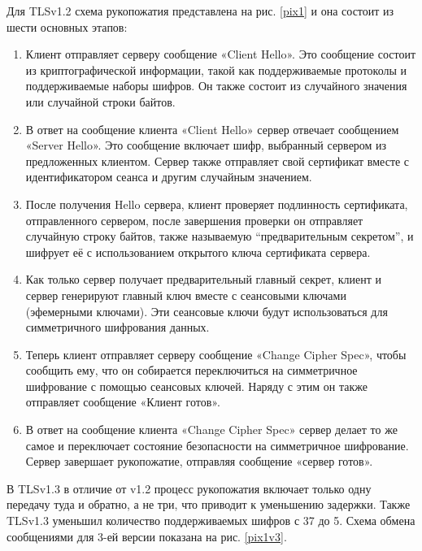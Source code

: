 Для TLSv1.2 схема рукопожатия представлена на рис. \ref{pix1} и она состоит из шести основных этапов:
\newpage
\begin{enumerate}
	\item Клиент отправляет серверу сообщение «Client Hello». Это сообщение состоит из криптографической информации, такой как поддерживаемые протоколы и поддерживаемые наборы шифров. Он также состоит из случайного значения или случайной строки байтов.
	\item В ответ на сообщение клиента «Client Hello» сервер отвечает сообщением «Server Hello». Это сообщение включает шифр, выбранный сервером из предложенных клиентом. Сервер также отправляет свой сертификат вместе с идентификатором сеанса и другим случайным значением.
	\item После получения Hello сервера, клиент проверяет подлинность сертификата, отправленного сервером, после завершения проверки он отправляет случайную строку байтов, также называемую ``предварительным секретом'', и шифрует её с использованием открытого ключа сертификата сервера.
	\item Как только сервер получает предварительный главный секрет, клиент и сервер генерируют главный ключ вместе с сеансовыми ключами (эфемерными ключами). Эти сеансовые ключи будут использоваться для симметричного шифрования данных.
	\item Теперь клиент отправляет серверу сообщение «Change Cipher Spec», чтобы сообщить ему, что он собирается переключиться на симметричное шифрование с помощью сеансовых ключей. Наряду с этим он также отправляет сообщение «Клиент готов».
	\item  В ответ на сообщение клиента «Change Cipher Spec» сервер делает то же самое и переключает состояние безопасности на симметричное шифрование. Сервер завершает рукопожатие, отправляя сообщение «сервер готов».
\end{enumerate}
В TLSv1.3 в отличие от v1.2 процесс рукопожатия включает только одну передачу туда и обратно, а не три, что приводит к уменьшению задержки. Также TLSv1.3 уменьшил количество поддерживаемых шифров с 37 до 5.  Схема обмена сообщениями для 3-ей версии показана на рис. \ref{pix1v3}.

